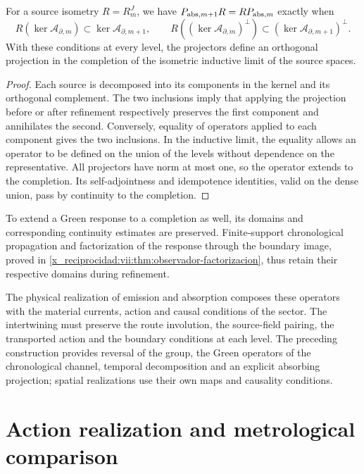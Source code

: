 \begin{proposition}
\label{x_reciprocidad:vii:prop:naturalidad-proyeccion-absorcion}
For a source isometry \(R=R_m^J\), we have
\(P_{{\rm abs},m+1}R=RP_{{\rm abs},m}\) exactly when
\[
 R(\ker\mathcal A_{\partial,m})
       \subset\ker\mathcal A_{\partial,m+1},\qquad
 R((\ker\mathcal A_{\partial,m})^\perp)
       \subset(\ker\mathcal A_{\partial,m+1})^\perp.
\]
With these conditions at every level, the projectors define an
orthogonal projection in the completion of the isometric inductive limit
of the source spaces.
\end{proposition}
\begin{proof}
Each source is decomposed into its components in the kernel and its
orthogonal complement. The two inclusions imply that applying the
projection before or after refinement respectively preserves the
first component and annihilates the second. Conversely, equality of
operators applied to each component gives the two inclusions.
In the inductive limit, the equality allows an operator to be defined on the
union of the levels without dependence on the representative. All projectors
have norm at most one, so the operator extends to the
completion. Its self-adjointness and idempotence identities, valid on
the dense union, pass by continuity to the completion.
\end{proof}

To extend a Green response to a completion as well, its
domains and corresponding continuity estimates are preserved.
Finite-support chronological propagation and factorization of the
response through the boundary image, proved in
\ref{x_reciprocidad:vii:thm:observador-factorizacion}, thus retain their respective
domains during refinement.

The physical realization of emission and absorption composes these operators with
the material currents, action and causal conditions of the sector.
The intertwining must preserve the route involution, the source-field
pairing, the transported action and the boundary conditions at
each level. The preceding construction provides reversal of the group, the
Green operators of the chronological channel, temporal decomposition and an explicit
absorbing projection; spatial realizations use their own maps and
causality conditions.


\chapter{Action realization and metrological comparison}

